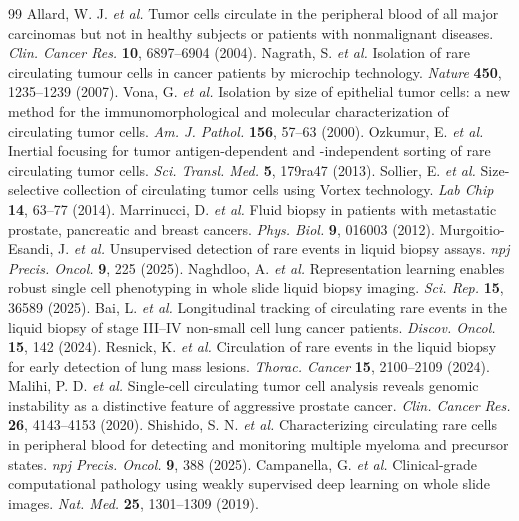 \documentclass[11pt]{article}
\begin{document}
\begin{thebibliography}{99}
 Allard, W. J. \textit{et al.} Tumor cells circulate in the peripheral blood of all major carcinomas but not in healthy subjects or patients with nonmalignant diseases. \textit{Clin. Cancer Res.} \textbf{10}, 6897--6904 (2004).
 Nagrath, S. \textit{et al.} Isolation of rare circulating tumour cells in cancer patients by microchip technology. \textit{Nature} \textbf{450}, 1235--1239 (2007).
 Vona, G. \textit{et al.} Isolation by size of epithelial tumor cells: a new method for the immunomorphological and molecular characterization of circulating tumor cells. \textit{Am. J. Pathol.} \textbf{156}, 57--63 (2000).
 Ozkumur, E. \textit{et al.} Inertial focusing for tumor antigen-dependent and -independent sorting of rare circulating tumor cells. \textit{Sci. Transl. Med.} \textbf{5}, 179ra47 (2013).
 Sollier, E. \textit{et al.} Size-selective collection of circulating tumor cells using Vortex technology. \textit{Lab Chip} \textbf{14}, 63--77 (2014).
 Marrinucci, D. \textit{et al.} Fluid biopsy in patients with metastatic prostate, pancreatic and breast cancers. \textit{Phys. Biol.} \textbf{9}, 016003 (2012).
 Murgoitio-Esandi, J. \textit{et al.} Unsupervised detection of rare events in liquid biopsy assays. \textit{npj Precis. Oncol.} \textbf{9}, 225 (2025).
 Naghdloo, A. \textit{et al.} Representation learning enables robust single cell phenotyping in whole slide liquid biopsy imaging. \textit{Sci. Rep.} \textbf{15}, 36589 (2025).
 Bai, L. \textit{et al.} Longitudinal tracking of circulating rare events in the liquid biopsy of stage III--IV non-small cell lung cancer patients. \textit{Discov. Oncol.} \textbf{15}, 142 (2024).
 Resnick, K. \textit{et al.} Circulation of rare events in the liquid biopsy for early detection of lung mass lesions. \textit{Thorac. Cancer} \textbf{15}, 2100--2109 (2024).
 Malihi, P. D. \textit{et al.} Single-cell circulating tumor cell analysis reveals genomic instability as a distinctive feature of aggressive prostate cancer. \textit{Clin. Cancer Res.} \textbf{26}, 4143--4153 (2020).
 Shishido, S. N. \textit{et al.} Characterizing circulating rare cells in peripheral blood for detecting and monitoring multiple myeloma and precursor states. \textit{npj Precis. Oncol.} \textbf{9}, 388 (2025).
 Campanella, G. \textit{et al.} Clinical-grade computational pathology using weakly supervised deep learning on whole slide images. \textit{Nat. Med.} \textbf{25}, 1301--1309 (2019).

\end{thebibliography}
\end{document}
